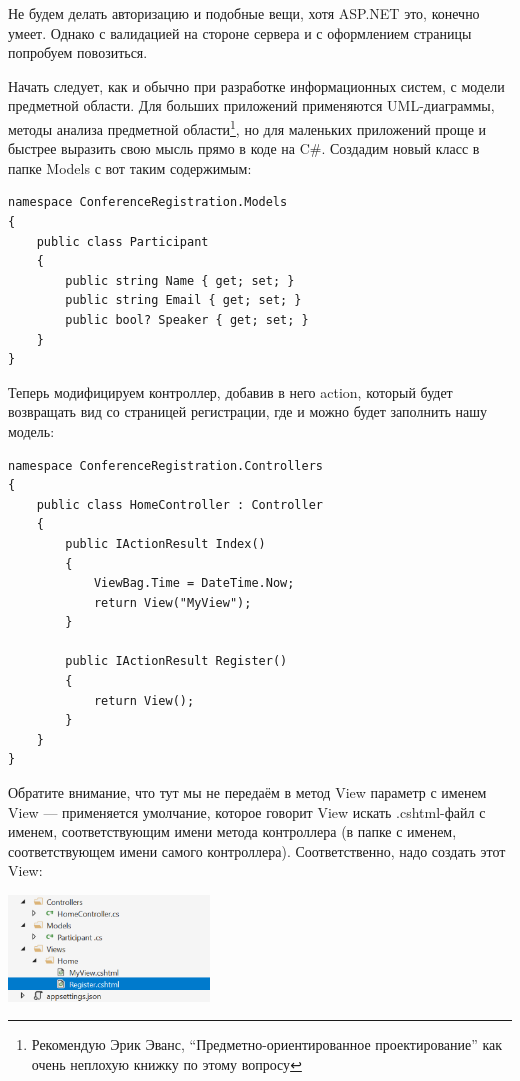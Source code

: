 \documentclass[a5paper]{article}
\begin{document}
Не будем делать авторизацию и подобные вещи, хотя ASP.NET это, конечно умеет. Однако с валидацией на стороне сервера и с оформлением страницы попробуем повозиться.

Начать следует, как и обычно при разработке информационных систем, с модели предметной области. Для больших приложений применяются UML-диаграммы, методы анализа предметной области\footnote{Рекомендую Эрик Эванс, ``Предметно-ориентированное проектирование'' как очень неплохую книжку по этому вопросу},
но для маленьких приложений проще и быстрее выразить свою мысль прямо в коде на C\#. Создадим новый класс в папке Models с вот таким содержимым:

\begin{verbatim}
namespace ConferenceRegistration.Models
{
    public class Participant
    {
        public string Name { get; set; }
        public string Email { get; set; }
        public bool? Speaker { get; set; }
    }
}
\end{verbatim}

Теперь модифицируем контроллер, добавив в него action, который будет возвращать вид со страницей регистрации, где и можно будет заполнить нашу модель:

\begin{verbatim}
namespace ConferenceRegistration.Controllers
{
    public class HomeController : Controller
    {
        public IActionResult Index()
        {
            ViewBag.Time = DateTime.Now;
            return View("MyView");
        }

        public IActionResult Register()
        {
            return View();
        }
    }
}
\end{verbatim}

Обратите внимание, что тут мы не передаём в метод View параметр с именем View --- применяется умолчание, которое говорит View искать .cshtml-файл с именем, соответствующим имени метода контроллера (в папке с именем, соответствующем имени самого контроллера).
Соответственно, надо создать этот View:

\begin{center}
	\includegraphics[width=0.4\textwidth]{secondView.png}
\end{center}
\end{document}
